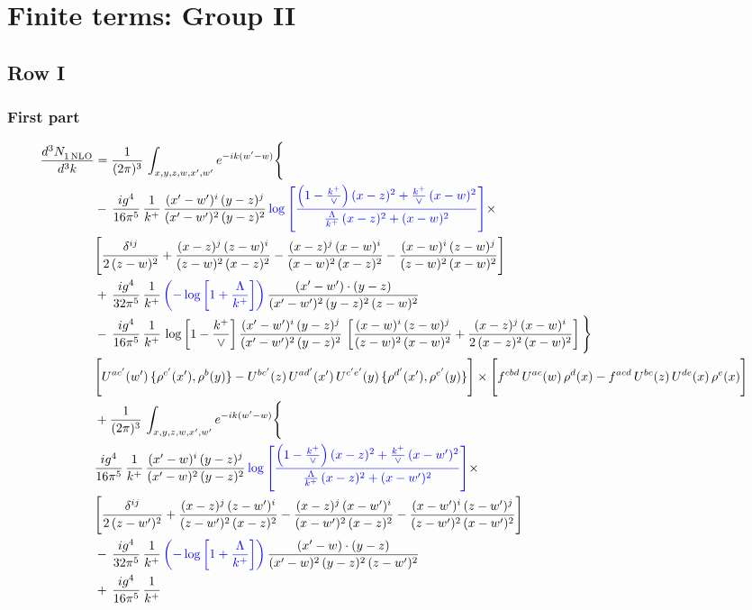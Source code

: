 \documentclass[9pt]{article}
\newcommand{\new}[1]{{\color{blue}#1}}
\numberwithin{equation}{section}
\begin{document}
\section{Finite terms: Group II}
\subsection{Row I}
\subsubsection{First part}
\begin{align}
 \frac{d^{3}N_{1\,\rm NLO}^{\rm}}{d^{3}k}  & =    \frac{1}{(2\pi)^{3}}\,\int_{x,y,z,w,x',w^{\prime}} e^{-ik(w^{\prime}-w)}\Bigg\{ \notag \\ & -\, \frac{ig^{4}}{16\pi^{5}}\,\frac{1}{k^{+}}\, \frac{(x'-w')^{i}\,(y-z)^{j}}{(x'-w')^{2}\,(y-z)^{2}}\,\new{\log{\left[\frac{\left(1-\frac{k^{+}}{\vee}\right)(x-z)^{2}+\frac{k^{+}}{\vee}\,(x-w)^{2}}{\frac{\Lambda}{k^{+}}\,(x-z)^{2}+(x-w)^{2}}\right]}}\times\notag \\ &  \Bigg[\frac{\delta^{ij}}{2\,(z-w)^{2}}+\frac{(x-z)^{j}\,(z-w)^{i}}{(z-w)^{2}\,(x-z)^{2}}-\frac{(x-z)^{j}\,(x-w)^{i}}{(x-w)^{2}\,(x-z)^{2}}-\frac{(x-w)^{i}\,(z-w)^{j}}{(z-w)^{2}\,(x-w)^{2}}\Bigg]\notag \\ & +\,\frac{ig^{4}}{32\pi^{5}}\,\frac{1}{k^{+}}\,\new{\left(-\log{\left[1+\frac{\Lambda}{k^{+}}\right]}\right)}\, \frac{(x'-w')\cdot (y-z)}{(x'-w')^{2}\,(y-z)^{2}\,(z-w)^{2}}\notag \\ & -\, \frac{ig^{4}}{16\pi^{5}}\,\frac{1}{k^{+}}\, \log{\left[1-\frac{k^{+}}{\vee}\right]}\,\frac{(x'-w')^{i}\,(y-z)^{j}}{(x'-w')^{2}\,(y-z)^{2}}\,\left[\frac{(x-w)^{i}\,(z-w)^{j}}{(z-w)^{2}\,(x-w)^{2}}+\frac{(x-z)^{j}\,(x-w)^{i}}{2\,(x-z)^{2}\, (x-w)^{2}}\right]\Bigg\} \notag \\ & \Bigg[U^{ac'}(w')\,\{\rho^{c'}(x'),\rho^{b}(y)\}-U^{bc'}(z)\,U^{ad'}(x')\,U^{c'e'}(y)\, \{\rho^{d'}(x'),\rho^{e'}(y)\}\Bigg]\times \Bigg[f^{cbd}\,U^{ac}(w)\,\rho^{d}(x)-f^{acd}\, U^{bc}(z)\,U^{de}(x)\,\rho^{e}(x)\Bigg]\notag \\ & + \frac{1}{(2\pi)^{3}}\,\int_{x,y,z,w,x',w^{\prime}} e^{-ik(w^{\prime}-w)}\Bigg\{ \notag \\ &  \frac{ig^{4}}{16\pi^{5}}\,\frac{1}{k^{+}}\, \frac{(x'-w)^{i}\,(y-z)^{j}}{(x'-w)^{2}\,(y-z)^{2}}\,\new{\log{\left[\frac{\left(1-\frac{k^{+}}{\vee}\right)(x-z)^{2}+\frac{k^{+}}{\vee}\,(x-w')^{2}}{\frac{\Lambda}{k^{+}}\,(x-z)^{2}+(x-w')^{2}}\right]}}\times\notag \\ &  \Bigg[\frac{\delta^{ij}}{2\,(z-w')^{2}}+\frac{(x-z)^{j}\,(z-w')^{i}}{(z-w')^{2}\,(x-z)^{2}}-\frac{(x-z)^{j}\,(x-w')^{i}}{(x-w')^{2}\,(x-z)^{2}}-\frac{(x-w')^{i}\,(z-w')^{j}}{(z-w')^{2}\,(x-w')^{2}}\Bigg]\notag \\ & -\,\frac{ig^{4}}{32\pi^{5}}\,\frac{1}{k^{+}}\,\new{\left(-\log{\left[1+\frac{\Lambda}{k^{+}}\right]}\right)}\, \frac{(x'-w)\cdot (y-z)}{(x'-w)^{2}\,(y-z)^{2}\,(z-w')^{2}}\notag \\ & +\,\frac{ig^{4}}{16\pi^{5}}\,\frac{1}{k^{+}}\, 
\end{align}
\end{document}
